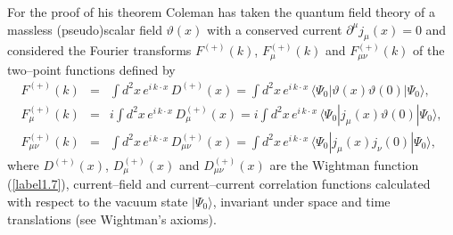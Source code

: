 \documentclass[a4paper,12pt] {article}
\begin{document}
For the proof of his theorem Coleman has taken the quantum field
theory of a massless (pseudo)scalar field $\vartheta(x)$ with a
conserved current $\partial^{\mu}j_{\mu}(x) = 0$ and considered the
Fourier transforms $F^{(+)}(k)$, $F^{(+)}_{\mu}(k)$ and
$F^{(+)}_{\mu\nu}(k)$ of the two--point functions defined by
%
\begin{eqnarray}\label{label4.1}
F^{(+)}(k) &=&\int d^2x\,e^{\textstyle i\,k\cdot x}\,D^{(+)}(x)
= \int d^2x\,e^{\textstyle i\,k\cdot x}\,\langle \Psi_0
|\vartheta(x)\vartheta(0)|\Psi_0 \rangle,\nonumber\\ F^{(+)}_{\mu}(k)
&=&i\int d^2x\,e^{\textstyle i\,k\cdot x}\,D^{(+)}_{\mu}(x) =
i\int d^2x\,e^{\textstyle i\,k\cdot x}\,\langle \Psi_0
|j_{\mu}(x)\vartheta(0)|\Psi_0 \rangle,\nonumber\\ F^{(+)}_{\mu\nu}(k)
&=&\int d^2x\,e^{\textstyle i\,k\cdot x}\,D^{(+)}_{\mu\nu}(x) =
\int d^2x\,e^{\textstyle i\,k\cdot x}\,\langle \Psi_0
|j_{\mu}(x)j_{\nu}(0)|\Psi_0 \rangle,
\end{eqnarray}
%
where $D^{(+)}(x)$, $D^{(+)}_{\mu}(x)$ and
$D^{(+)}_{\mu\nu}(x)$ are the Wightman function
(\ref{label1.7}), current--field and current--current correlation
functions calculated with respect to the vacuum state
$|\Psi_0\rangle$, invariant under space and time translations (see
Wightman's axioms).
\end{document}

